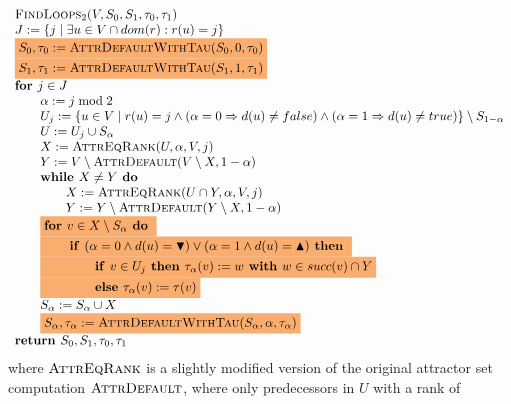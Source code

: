 \documentclass{article}
\newcommand{\If}{\text{\textbf{if }}}
\newcommand{\Do}{\text{\textbf{ do }}}
\newcommand{\Then}{\text{\textbf{ then }}}
\newcommand{\Else}{\text{\textbf{else }}}
\newcommand{\For}{\text{\textbf{for }}}
\newcommand{\While}{\text{\textbf{while }}}
\newcommand{\Return}{\text{\textbf{return }}}
\begin{document}
\begin{equation*}
\begin{array}{l}
\text{\textsc{FindLoops}}_2(V, S_0, S_1, \tau_0, \tau_1)\\
J := \{ j \mid \exists u \in V \cap dom(r) : r(u) = j \} \\
\colorbox{Apricot}{$S_0, \tau_0 := \textsc{AttrDefaultWithTau}(S_0, 0, \tau_0)$} \\
\colorbox{Apricot}{$S_1, \tau_1 := \textsc{AttrDefaultWithTau}(S_1, 1, \tau_1)$} \\
\textbf{for } j \in J \\
\qquad \alpha := j \bmod 2\\
\qquad U_j := \{u \in V \mid r(u) = j \wedge (\alpha = 0 \Rightarrow d(u) \neq false) 
\wedge (\alpha = 1 \Rightarrow d(u) \neq true) \} \setminus S_{1 - \alpha} \\
\qquad U := U_j \cup S_\alpha\\
\qquad X := \textsc{AttrEqRank}(U, \alpha, V, j) \\
\qquad Y := V \setminus \textsc{AttrDefault}(V \setminus X, 1-\alpha) \\
\qquad \While X \neq Y \textbf{ do }\\
\qquad \qquad X := \textsc{AttrEqRank}(U \cap Y, \alpha, V, j) \\
\qquad \qquad Y := Y \setminus \textsc{AttrDefault}(Y \setminus X, 1-\alpha) \\
\qquad \colorbox{Apricot}{$ \For v \in X \setminus S_{\alpha} \Do $} \\
\qquad \colorbox{Apricot}{$ \qquad \If (\alpha = 0 \land d(u) = \blacktriangledown) \lor (\alpha = 1 \land d(u) = \blacktriangle) \Then $} \\
\qquad \colorbox{Apricot}{$ \qquad \qquad \If v \in U_j \Then \tau_{\alpha}(v) := w \textbf{ with } w \in succ(v) \cap Y $} \\
\qquad \colorbox{Apricot}{$ \qquad \qquad \Else \tau_{\alpha}(v) := \tau(v)$} \\
\qquad S_\alpha := S_\alpha \cup X \\
\qquad \colorbox{Apricot}{$ S_\alpha, \tau_\alpha := \textsc{AttrDefaultWithTau}(S_\alpha, \alpha, \tau_\alpha)$} \\
\Return S_0, S_1, \tau_0,\tau_1
\end{array}
\end{equation*}
where $\textsc{AttrEqRank}$ is a slightly modified version of the original attractor
set computation $\textsc{AttrDefault}$, where only predecessors in $U$ with a rank of 
\end{document}
